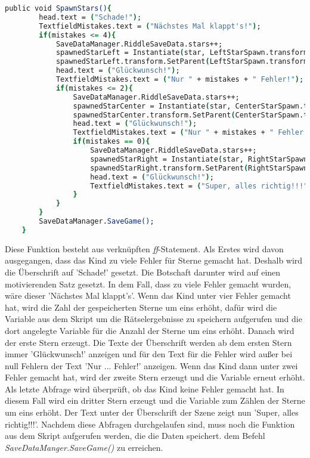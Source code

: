 \begin{lstlisting}[language=csh, caption={SpawnStars.cs Start-Funktion}]
	public void SpawnStars(){
		head.text = ("Schade!");
		TextfieldMistakes.text = ("Nächstes Mal klappt's!");
		if(mistakes <= 4){
			SaveDataManager.RiddleSaveData.stars++;
			spawnedStarLeft = Instantiate(star, LeftStarSpawn.transform.position, Quaternion.identity);
			spawnedStarLeft.transform.SetParent(LeftStarSpawn.transform);
			head.text = ("Glückwunsch!");
			TextfieldMistakes.text = ("Nur " + mistakes + " Fehler!");
			if(mistakes <= 2){
				SaveDataManager.RiddleSaveData.stars++;
				spawnedStarCenter = Instantiate(star, CenterStarSpawn.transform.position, Quaternion.identity);
				spawnedStarCenter.transform.SetParent(CenterStarSpawn.transform);
				head.text = ("Glückwunsch!");
				TextfieldMistakes.text = ("Nur " + mistakes + " Fehler!");
				if(mistakes == 0){
					SaveDataManager.RiddleSaveData.stars++;
					spawnedStarRight = Instantiate(star, RightStarSpawn.transform.position, Quaternion.identity);
					spawnedStarRight.transform.SetParent(RightStarSpawn.transform);
					head.text = ("Glückwunsch!");
					TextfieldMistakes.text = ("Super, alles richtig!!!");
				}
			}
		}
		SaveDataManager.SaveGame();
	}
\end{lstlisting}
Diese Funktion besteht aus verknüpften \textit{ff}-Statement. Als Erstes wird davon ausgegangen, dass das Kind zu viele Fehler für Sterne gemacht hat. Deshalb wird die Überschrift auf 'Schade!' gesetzt. Die Botschaft darunter wird auf einen motivierenden Satz gesetzt. In dem Fall, dass zu viele Fehler gemacht wurden, wäre dieser 'Nächstes Mal klappt's'. Wenn das Kind unter vier Fehler gemacht hat, wird die Zahl der gespeicherten Sterne um eins erhöht, dafür wird die Variable aus dem Skript um die Rätselergebnisse zu speichern aufgerufen und die dort angelegte Variable für die Anzahl der Sterne um eins erhöht. Danach wird der erste Stern erzeugt. Die Texte der Überschrift werden ab dem ersten Stern immer 'Glückwunsch!' anzeigen und für den Text für die Fehler wird außer bei null Fehlern der Text 'Nur ... Fehler!' anzeigen. Wenn das Kind dann unter zwei Fehler gemacht hat, wird der zweite Stern erzeugt und die Variable erneut erhöht. Als letzte Abfrage wird überprüft, ob das Kind keine Fehler gemacht hat. In diesem Fall wird ein dritter Stern erzeugt und die Variable zum Zählen der Sterne um eins erhöht. Der Text unter der Überschrift der Szene zeigt nun 'Super, alles richtig!!!'. Nachdem diese Abfragen durchgelaufen sind, muss noch die Funktion aus dem Skript aufgerufen werden, die die Daten speichert. dem Befehl \textit{SaveDataManger.SaveGame()} zu erreichen.\\